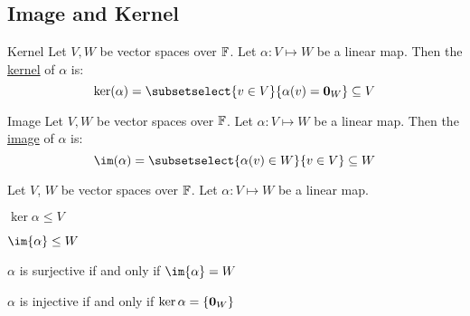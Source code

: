 \documentclass[../Main.tex]{subfiles}
\begin{document}
\subsection{Image and Kernel}
\begin{definition}{Kernel}
    Let $V, W$ be vector spaces over $\mathbb{F}$. Let $\alpha : V \mapsto W$ be a linear map. Then the \underline{kernel} of $\alpha$ is:
    \begin{equation*}
        \kera = \subsetselect{v \in V}{\alpha(v) = \zv_W} \subseteq V
    \end{equation*}
\end{definition}
\begin{definition}{Image}
    Let $V, W$ be vector spaces over $\mathbb{F}$. Let $\alpha : V \mapsto W$ be a linear map. Then the \underline{image} of $\alpha$ is:
    \begin{equation*}
        \im(\alpha) = \subsetselect{\alpha(v) \in W}{v \in V} \subseteq W
    \end{equation*}
\end{definition}
\begin{propositions}{
        Let $V$, $W$ be vector spaces over $\mathbb{F}$. Let $\alpha : V \mapsto W$ be a linear map.
        \label{propKernelImage}
    }
    \item $\ker{\alpha} \leq V$ \label{propKerSubspace}
    \item $\im{\alpha} \leq W$ \label{propKerImage}
    \item $\alpha$ is surjective if and only if $\im{\alpha} = W$ \label{propSurjectiveIffIm}
    \item $\alpha$ is injective if and only if $\ker{\alpha} = \{\boldsymbol{0}_W\}$ \label{propInjectiveIffKer}
\end{propositions}
\end{document}
